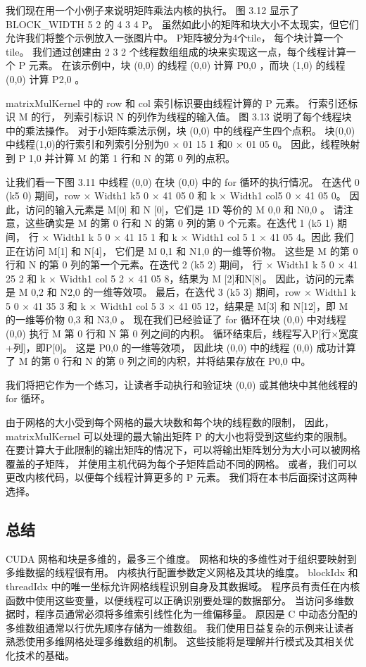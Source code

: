 我们现在用一个小例子来说明矩阵乘法内核的执行。 图 3.12 显示了 BLOCK\_WIDTH 5 2 的 4 3 4 P。
虽然如此小的矩阵和块大小不太现实，但它们允许我们将整个示例放入一张图片中。 P矩阵被分为4个tile，
每个块计算一个tile。 我们通过创建由 2 3 2 个线程数组组成的块来实现这一点，每个线程计算一个 P 元素。 
在该示例中，块 (0,0) 的线程 (0,0) 计算 P0,0 ，而块 (1,0) 的线程 (0,0) 计算 P2,0 。

matrixMulKernel 中的 row 和 col 索引标识要由线程计算的 P 元素。 行索引还标识 M 的行，
列索引标识 N 的列作为线程的输入值。 图 3.13 说明了每个线程块中的乘法操作。 
对于小矩阵乘法示例，块 (0,0) 中的线程产生四个点积。 块(0,0)中线程(1,0)的行索引和列索引分别为0 × 01 15 1
和0 × 01 05 0。 因此，线程映射到 P 1,0 并计算 M 的第 1 行和 N 的第 0 列的点积。

让我们看一下图 3.11 中线程 (0,0) 在块 (0,0) 中的 for 循环的执行情况。 
在迭代 0 (k5 0) 期间，row × Width1 k5 0 × 41 05 0 和 k × Width1 col5 0 × 41 05 0。
因此，访问的输入元素是 M[0] 和 N [0]，它们是 1D 等价的 M 0,0 和 N0,0 。 
请注意，这些确实是 M 的第 0 行和 N 的第 0 列的第 0 个元素。在迭代 1 (k5 1) 期间，
行 × Width1 k 5 0 × 41 15 1 和 k × Width1 col 5 1 × 41 05 4。因此 我们正在访问 M[1] 和 N[4]，
它们是 M 0,1 和 N1,0 的一维等价物。 这些是 M 的第 0 行和 N 的第 0 列的第一个元素。在迭代 2 (k5 2) 期间，
行 × Width1 k 5 0 × 41 25 2 和 k × Width1 col 5 2 × 41 05 8，结果为 M [2]和N[8]。 
因此，访问的元素是 M 0,2 和 N2,0 的一维等效项。 最后，在迭代 3 (k5 3) 期间，row × Width1 k 5 0 × 41 35 3 
和 k × Width1 col 5 3 × 41 05 12，结果是 M[3] 和 N[12]，即 M 的一维等价物 0,3 和 N3,0 。 
现在我们已经验证了 for 循环在块 (0,0) 中对线程 (0,0) 执行 M 第 0 行和 N 第 0 列之间的内积。 
循环结束后，线程写入P[行×宽度+列]，即P[0]。 这是 P0,0 的一维等效项，
因此块 (0,0) 中的线程 (0,0) 成功计算了 M 的第 0 行和 N 的第 0 列之间的内积，并将结果存放在 P0,0 中。

我们将把它作为一个练习，让读者手动执行和验证块 (0,0) 或其他块中其他线程的 for 循环。

由于网格的大小受到每个网格的最大块数和每个块的线程数的限制，
因此，matrixMulKernel 可以处理的最大输出矩阵 P 的大小也将受到这些约束的限制。 
在要计算大于此限制的输出矩阵的情况下，可以将输出矩阵划分为大小可以被网格覆盖的子矩阵，
并使用主机代码为每个子矩阵启动不同的网格。 或者，我们可以更改内核代码，以便每个线程计算更多的 P 元素。 
我们将在本书后面探讨这两种选择。

\subsection{总结}
CUDA 网格和块是多维的，最多三个维度。 网格和块的多维性对于组织要映射到多维数据的线程很有用。 
内核执行配置参数定义网格及其块的维度。 blockIdx 和 threadIdx 中的唯一坐标允许网格线程识别自身及其数据域。 
程序员有责任在内核函数中使用这些变量，以便线程可以正确识别要处理的数据部分。 
当访问多维数据时，程序员通常必须将多维索引线性化为一维偏移量。 
原因是 C 中动态分配的多维数组通常以行优先顺序存储为一维数组。 
我们使用日益复杂的示例来让读者熟悉使用多维网格处理多维数组的机制。 这些技能将是理解并行模式及其相关优化技术的基础。